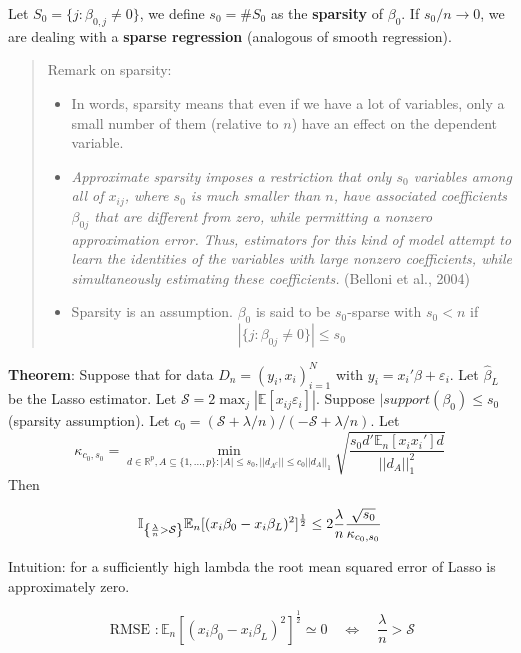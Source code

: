 \documentclass[12pt,]{book}
\providecommand{\tightlist}{%
  \setlength{\itemsep}{0pt}\setlength{\parskip}{0pt}}
\begin{document}
Let \(S_0 = \{ j: \beta_{0,j} \ne 0 \}\), we define \(s_0 = \# S_0\) as the \textbf{sparsity} of \(\beta_0\). If \(s_0/n \to 0\), we are dealing with a \textbf{sparse regression} (analogous of smooth regression).

\begin{quote}
Remark on sparsity:

\begin{itemize}
\tightlist
\item
  In words, sparsity means that even if we have a lot of variables, only a small number of them (relative to \(n\)) have an effect on the dependent variable.
\item
  \emph{Approximate sparsity imposes a restriction that only \(s_0\) variables among all of \(x_{ij}\), where \(s_0\) is much smaller than \(n\), have associated coefficients \(\beta_{0j}\) that are different from zero, while permitting a nonzero approximation error. Thus, estimators for this kind of model attempt to learn the identities of the variables with large nonzero coefficients, while simultaneously estimating these coefficients.} (Belloni et al., 2004)
\item
  Sparsity is an assumption. \(\beta_0\) is said to be \(s_0\)-sparse with \(s_0 < n\) if
  \[
  | \{ j: \beta_{0j} \neq 0 \} | \leq s_0
  \]
\end{itemize}
\end{quote}

\textbf{Theorem}:
Suppose that for data \(D_n = (y_i, x_i)_{i=1}^N\) with \(y_i = x_i' \beta + \varepsilon_i\). Let \(\hat{\beta}_L\) be the Lasso estimator. Let \(\mathcal{S} = 2 \max_j | \mathbb E[ x_{ij} \varepsilon_i] |\). Suppose \(|support(\beta_0) \leq s_0\) (sparsity assumption). Let \(c_0 = (\mathcal{S} + \lambda/n )/(-\mathcal{S} + \lambda/n )\). Let
\[
    \kappa_{c_0, s_0} = \min_{  d \in \mathbb R^p, A \subseteq \{ 1, ... , p \} : |A| \leq s_0 ,  || d_{A^c}|| \leq c_0 || d_A ||_1  }  \sqrt{  \frac{ s_0 d' \mathbb E_n [x_i x_i'] d }{|| d_A ||_1^2}  }
\]
Then

\[
    \mathbb I_{ \left\{ \frac{\lambda}{n} > \mathcal{S}  \right\}} \mathbb E_n [(x_i \beta_0 - x_i \beta_L)^2]^{\frac{1}{2}}  \leq 2 \frac{\lambda}{n} \frac{\sqrt{s_0}}{\kappa_{c_0, s_0}} \\
\]

Intuition: for a sufficiently high lambda the root mean squared error of Lasso is approximately zero.

\[
    \text{ RMSE }:  \mathbb E_n [(x_i \beta_0 - x_i \beta_L)^2]^{\frac{1}{2}}  \simeq 0  \quad \Leftrightarrow \quad \frac{\lambda}{n} > \mathcal{S}
\]
\end{document}

